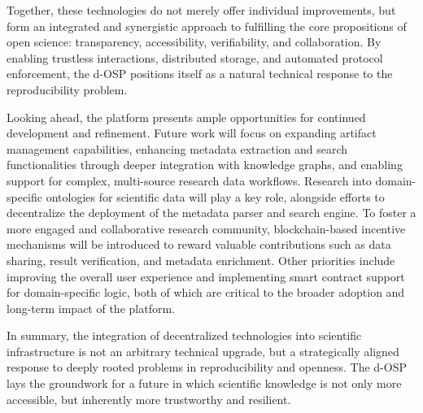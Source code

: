 \documentclass[final]{rc-book-2.14}
\begin{document}
Together, these technologies do not merely offer individual improvements, but form an integrated and synergistic approach to fulfilling the core propositions of open science: transparency, accessibility, verifiability, and collaboration. By enabling trustless interactions, distributed storage, and automated protocol enforcement, the d-OSP positions itself as a natural technical response to the reproducibility problem.

Looking ahead, the platform presents ample opportunities for continued development and refinement. Future work will focus on expanding artifact management capabilities, enhancing metadata extraction and search functionalities through deeper integration with knowledge graphs, and enabling support for complex, multi-source research data workflows. Research into domain-specific ontologies for scientific data will play a key role, alongside efforts to decentralize the deployment of the metadata parser and search engine. To foster a more engaged and collaborative research community, blockchain-based incentive mechanisms will be introduced to reward valuable contributions such as data sharing, result verification, and metadata enrichment. Other priorities include improving the overall user experience and implementing smart contract support for domain-specific logic, both of which are critical to the broader adoption and long-term impact of the platform.

In summary, the integration of decentralized technologies into scientific infrastructure is not an arbitrary technical upgrade, but a strategically aligned response to deeply rooted problems in reproducibility and openness. The d-OSP lays the groundwork for a future in which scientific knowledge is not only more accessible, but inherently more trustworthy and resilient.


\backmatter



\end{document}
